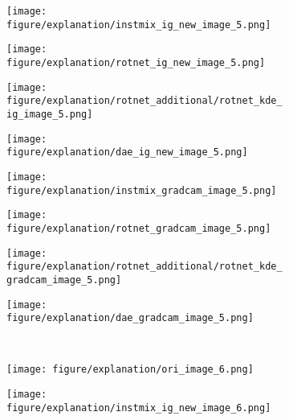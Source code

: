 \documentclass{article} \usepackage{iclr2021_conference,times}
\begin{document}
\begin{figure}[h!]
\begin{subfigure}{.11\textwidth}
  \centering
  \texttt{[image: figure/explanation/instmix\_ig\_new\_image\_5.png]}
\end{subfigure}
\hspace{-2mm}
\begin{subfigure}{.11\textwidth}
  \centering
  \texttt{[image: figure/explanation/rotnet\_ig\_new\_image\_5.png]}
\end{subfigure}
\hspace{-2mm}
\begin{subfigure}{.11\textwidth}
  \centering
  \texttt{[image: figure/explanation/rotnet\_additional/rotnet\_kde\_ig\_image\_5.png]}
\end{subfigure}
\hspace{-2mm}
\begin{subfigure}{.11\textwidth}
  \centering
  \texttt{[image: figure/explanation/dae\_ig\_new\_image\_5.png]}
\end{subfigure}
\hspace{-2mm}
\begin{subfigure}{.11\textwidth}
  \centering
  \texttt{[image: figure/explanation/instmix\_gradcam\_image\_5.png]}
\end{subfigure}
\hspace{-2mm}
\begin{subfigure}{.11\textwidth}
  \centering
  \texttt{[image: figure/explanation/rotnet\_gradcam\_image\_5.png]}
\end{subfigure}
\hspace{-2mm}
\begin{subfigure}{.11\textwidth}
  \centering
  \texttt{[image: figure/explanation/rotnet\_additional/rotnet\_kde\_gradcam\_image\_5.png]}
\end{subfigure}
\hspace{-2mm}
\begin{subfigure}{.11\textwidth}
  \centering
  \texttt{[image: figure/explanation/dae\_gradcam\_image\_5.png]}
\end{subfigure}\\
\begin{subfigure}{.11\textwidth}
  \centering
  \texttt{[image: figure/explanation/ori\_image\_6.png]}
\end{subfigure}
\hspace{-2mm}
\begin{subfigure}{.11\textwidth}
  \centering
  \texttt{[image: figure/explanation/instmix\_ig\_new\_image\_6.png]}

\end{subfigure}
\end{figure}
\end{document}
